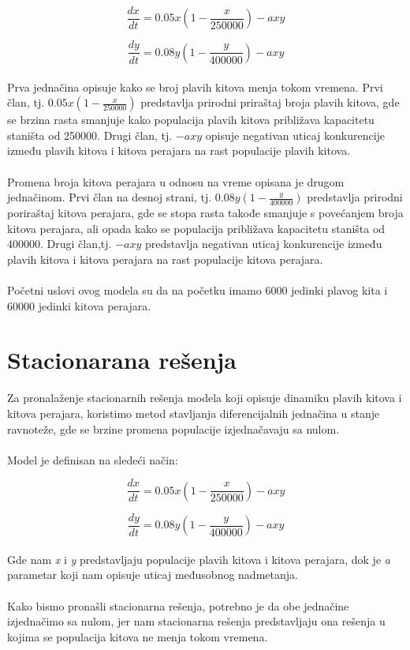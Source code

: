 \documentclass[a4paper]{article}
\begin{document}
{	\[
		\frac{dx}{dt} = 0.05x(1 - \frac{x}{250000}) - axy
 	\] 
 	
 	\[
 		\frac{dy}{dt} = 0.08y(1 - \frac{y}{400000}) - axy 
 	\] 
 	\\
 	
 	Prva jednačina opisuje kako se broj plavih kitova menja tokom vremena. Prvi član, tj. $0.05x(1 - \frac{x}{250000})$ predstavlja  prirodni priraštaj broja plavih kitova, gde se brzina rasta smanjuje kako populacija plavih kitova približava kapacitetu staništa od 250000. Drugi član, tj. $-axy$ opisuje negativan uticaj konkurencije između plavih kitova i kitova perajara na rast populacije plavih kitova.\\ 
 	\\	
	Promena broja kitova perajara u odnosu na vreme opisana je drugom jednačinom. Prvi član na desnoj strani, tj. $0.08y(1 - \frac{y}{400000})$ predstavlja prirodni poriraštaj kitova perajara, gde se stopa rasta takođe smanjuje s povećanjem broja kitova perajara, ali opada kako se populacija približava kapacitetu staništa od 400000. Drugi član,tj. $-axy$ predstavlja negativan uticaj konkurencije između plavih kitova i kitova perajara na rast populacije kitova perajara.\\
	\\
	Početni uslovi ovog modela su da na početku imamo 6000 jedinki plavog kita i 60000 jedinki kitova perajara.  
	
	
	\section{Stacionarana rešenja}
	\label{sec: stacionarna-resenja}
	
	Za pronalaženje stacionarnih rešenja modela koji opisuje dinamiku plavih kitova i kitova perajara, koristimo metod stavljanja diferencijalnih jednačina u stanje ravnoteže, gde se brzine promena populacije izjednačavaju sa nulom. \\ 
	\\ 
	Model je definisan na sledeći način:
	
	\begin{equation}
		\frac{dx}{dt} = 0.05x(1 - \frac{x}{250000}) - axy
	\end{equation}
	
	\begin{equation}
		\frac{dy}{dt} = 0.08y(1 - \frac{y}{400000}) - axy
	\end{equation}
	\\
	Gde nam \textit{x} i \textit{y} predstavljaju populacije plavih kitova i kitova perajara, dok je \textit{a} parametar koji nam opisuje uticaj međusobnog nadmetanja.\\
	\\
	Kako bismo pronašli stacionarna rešenja, potrebno je da obe jednačine izjednačimo sa nulom, jer nam stacionarna rešenja predstavljaju ona rešenja u kojima se populacija kitova ne menja tokom vremena.\\
	
}
\end{document}
